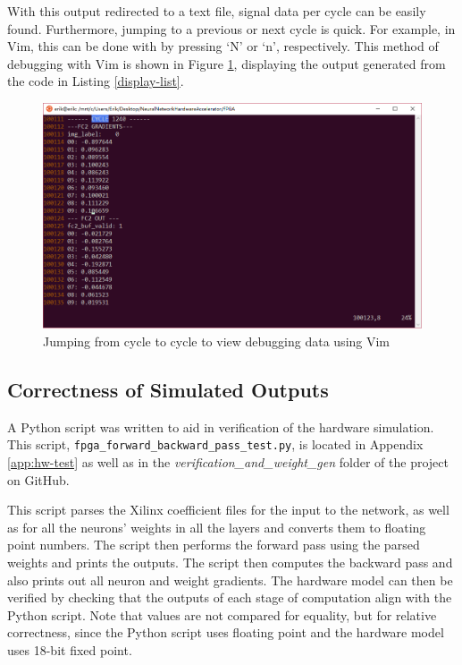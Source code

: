 With this output redirected to a text file, signal data per cycle can be easily found. Furthermore, jumping to a previous or next cycle is quick. For example, in Vim, this can be done with by pressing `N' or `n', respectively. This method of debugging with Vim is shown in Figure \ref{vim-out}, displaying the output generated from the code in Listing \ref{display-list}.
\begin{figure}
	\centering 
	\includegraphics[width=\textwidth]{figures/vim_output}
	\caption{Jumping from cycle to cycle to view debugging data using Vim}\label{vim-out}
\end{figure}

\subsection{Correctness of Simulated Outputs}
A Python script was written to aid in verification of the hardware simulation. This script, \texttt{fpga\_forward\_backward\_pass\_test.py}, is located in Appendix \ref{app:hw-test} as well as in the \textit{verification\_and\_weight\_gen} folder of the project on GitHub.

This script parses the Xilinx coefficient files for the input to the network, as well as for all the neurons' weights in all the layers and converts them to floating point numbers. The script then performs the forward pass using the parsed weights and prints the outputs. The script then computes the backward pass and also prints out all neuron and weight gradients. The hardware model can then be verified by checking that the outputs of each stage of computation align with the Python script. Note that values are not compared for equality, but for relative correctness, since the Python script uses floating point and the hardware model uses 18-bit fixed point.

